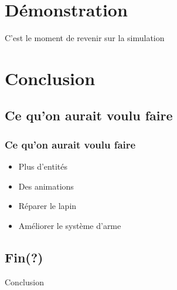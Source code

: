 \documentclass{beamer}
\begin{document}
\section{Démonstration}

\begin{frame}
	\begin{large}
		\begin{center}
			C'est le moment de revenir sur la simulation
		\end{center}
	\end{large}
\end{frame}

\section{Conclusion}
\subsection{Ce qu'on aurait voulu faire}

\begin{frame} \frametitle{Ce qu'on aurait voulu faire}
	\begin{itemize}
		\item Plus d'entités
		\item Des animations
		\item Réparer le lapin
		\item Améliorer le système d'arme
	\end{itemize}
\end{frame}

\subsection{Fin(?)}

\begin{frame}
	\begin{large}
		\begin{center}
			Conclusion
		\end{center}
	\end{large}
\end{frame}
\end{document}
